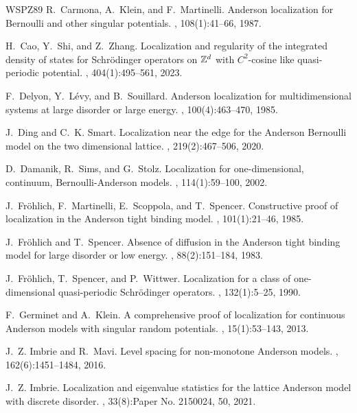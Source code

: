 \documentclass[11pt,reqno,UTF8,twoside]{amsart}
\theoremstyle{definition}
\numberwithin{equation}{section}
\begin{document}
\begin{thebibliography}{WSPZ89}
R.~Carmona, A.~Klein, and F.~Martinelli.
\newblock Anderson localization for {B}ernoulli and other singular potentials.
, 108(1):41--66, 1987.

H.~Cao, Y.~Shi, and Z.~Zhang.
\newblock Localization and regularity of the integrated density of states for
  {S}chr\"{o}dinger operators on {$\Bbb Z^d$} with {$C^2$}-cosine like
  quasi-periodic potential.
, 404(1):495--561, 2023.

F.~Delyon, Y.~L\'{e}vy, and B.~Souillard.
\newblock Anderson localization for multidimensional systems at large disorder
  or large energy.
, 100(4):463--470, 1985.

J.~Ding and C.~K. Smart.
\newblock Localization near the edge for the {A}nderson {B}ernoulli model on
  the two dimensional lattice.
, 219(2):467--506, 2020.

D.~Damanik, R.~Sims, and G.~Stolz.
\newblock Localization for one-dimensional, continuum, {B}ernoulli-{A}nderson
  models.
, 114(1):59--100, 2002.

J.~Fr\"{o}hlich, F.~Martinelli, E.~Scoppola, and T.~Spencer.
\newblock Constructive proof of localization in the {A}nderson tight binding
  model.
, 101(1):21--46, 1985.

J.~Fr\"{o}hlich and T.~Spencer.
\newblock Absence of diffusion in the {A}nderson tight binding model for large
  disorder or low energy.
, 88(2):151--184, 1983.

J.~Fr\"{o}hlich, T.~Spencer, and P.~Wittwer.
\newblock Localization for a class of one-dimensional quasi-periodic
  {S}chr\"{o}dinger operators.
, 132(1):5--25, 1990.

F.~Germinet and A.~Klein.
\newblock A comprehensive proof of localization for continuous {A}nderson
  models with singular random potentials.
, 15(1):53--143, 2013.

J.~Z. Imbrie and R.~Mavi.
\newblock Level spacing for non-monotone {A}nderson models.
, 162(6):1451--1484, 2016.

J.~Z. Imbrie.
\newblock Localization and eigenvalue statistics for the lattice {A}nderson
  model with discrete disorder.
, 33(8):Paper No. 2150024, 50, 2021.


\end{thebibliography}
\end{document}
